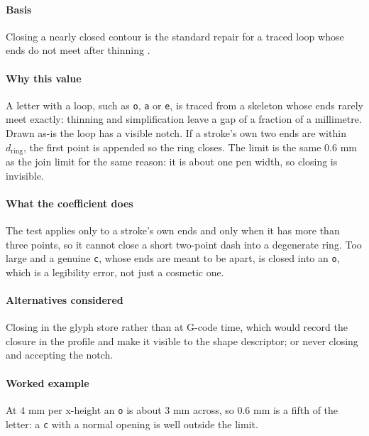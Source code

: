 \paragraph{Basis}

Closing a nearly closed contour is the standard repair for a traced loop whose ends do not meet after thinning \cite{lam1992}.

\paragraph{Why this value}

A letter with a loop, such as \texttt{o}, \texttt{a} or \texttt{e}, is traced from a skeleton whose ends rarely meet exactly: thinning and simplification leave a gap of a fraction of a millimetre. Drawn as-is the loop has a visible notch. If a stroke's own two ends are within $d_{\text{ring}}$, the first point is appended so the ring closes. The limit is the same $0.6$ mm as the join limit for the same reason: it is about one pen width, so closing is invisible.

\paragraph{What the coefficient does}

The test applies only to a stroke's own ends and only when it has more than three points, so it cannot close a short two-point dash into a degenerate ring. Too large and a genuine \texttt{c}, whose ends are meant to be apart, is closed into an \texttt{o}, which is a legibility error, not just a cosmetic one.

\paragraph{Alternatives considered}

Closing in the glyph store rather than at G-code time, which would record the closure in the profile and make it visible to the shape descriptor; or never closing and accepting the notch.

\paragraph{Worked example}

At $4$ mm per x-height an \texttt{o} is about $3$ mm across, so $0.6$ mm is a fifth of the letter: a \texttt{c} with a normal opening is well outside the limit.

